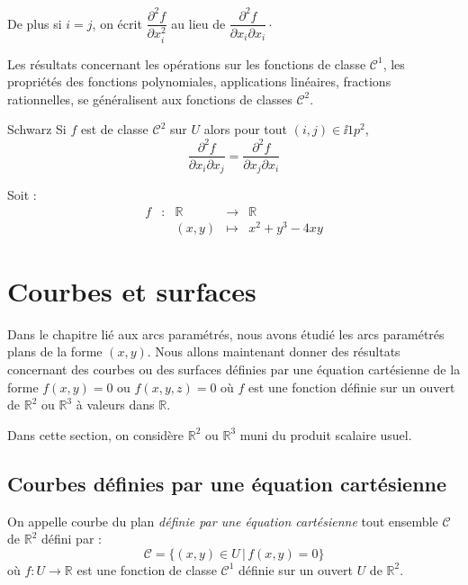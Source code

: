 \documentclass[french,11pt,twoside]{VcCours}
\begin{document}
De plus si $i=j$, on écrit $\dfrac{\partial^2 f}{\partial x_i^2}$ au lieu de $\dfrac{\partial^2 f}{\partial x_i \partial x_i}\cdot$

\medskip


\begin{Remarque}{} Les résultats concernant les opérations sur les fonctions de classe $\mathcal{C}^1$, les propriétés des fonctions polynomiales, applications linéaires, fractions rationnelles, se généralisent aux fonctions de classes $\mathcal{C}^2$.
\end{Remarque}

\begin{Theoreme}{Schwarz}
Si $f$ est de classe $\mathcal{C}^2$ sur $U$ alors pour tout $(i,j) \in \ii{1}{p}^2$,
$$ \dfrac{\partial^2 f}{\partial x_i \partial x_j} = \dfrac{\partial^2 f}{\partial x_j \partial x_i}$$
\end{Theoreme}

\begin{Exemple}{} Soit :
$$\begin{array}{cccll}
f& : & \mathbb{R} & \rightarrow & \mathbb{R} \\
& & (x,y) & \mapsto & x^2+y^3-4xy 
\end{array}$$

\vspace{5cm}
\end{Exemple}

\section{Courbes et surfaces}
Dans le chapitre lié aux arcs paramétrés, nous avons étudié les arcs paramétrés plans de la forme $(x,y)$. Nous allons maintenant donner des résultats concernant des courbes ou des surfaces définies par une équation cartésienne de la forme $f(x,y)=0$ ou $f(x,y,z)=0$ où $f$ est une fonction définie sur un ouvert de $\mathbb{R}^2$ ou $\mathbb{R}^3$ à valeurs dans $\mathbb{R}$.

\medskip

Dans cette section, on considère $\mathbb{R}^2$ ou $\mathbb{R}^3$ muni du produit scalaire usuel.

\subsection{Courbes définies par une équation cartésienne}
\medskip

On appelle courbe du plan \emph{définie par une équation cartésienne} tout ensemble $\mathcal{C}$ de $\mathbb{R}^2$ défini par :
$$ \mathcal{C} = \lbrace (x,y) \in U \, \vert \, f(x,y)=0 \rbrace$$
où $f : U \rightarrow \mathbb{R}$ est une fonction de classe $\mathcal{C}^1$ définie sur un ouvert $U$ de $\mathbb{R}^2$.
\end{document}
